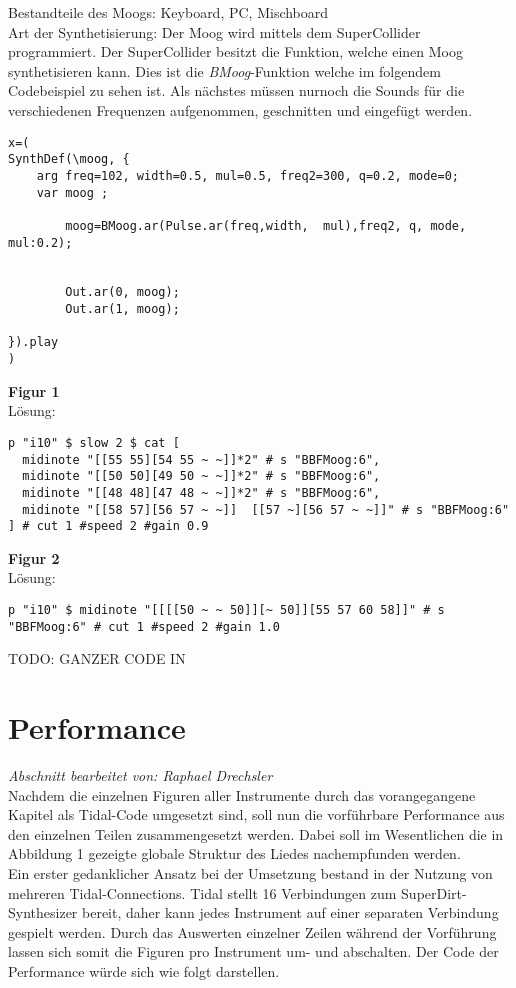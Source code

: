 \documentclass[
10pt, %
a4paper, %
oneside, %
headinclude,footinclude, %
BCOR5mm, %
]{scrartcl}
\begin{document}
\noindent Bestandteile des Moogs: Keyboard, PC, Mischboard\\
Art der Synthetisierung: Der Moog wird mittels dem SuperCollider programmiert. Der SuperCollider besitzt die Funktion, welche einen Moog synthetisieren kann.
Dies ist die \textit{BMoog}-Funktion welche im folgendem Codebeispiel zu sehen ist. Als nächstes müssen nurnoch die Sounds für die verschiedenen
Frequenzen aufgenommen, geschnitten und eingefügt werden.
\begin{lstlisting}
x=(
SynthDef(\moog, {
	arg freq=102, width=0.5, mul=0.5, freq2=300, q=0.2, mode=0;
	var moog ;
	
		moog=BMoog.ar(Pulse.ar(freq,width,  mul),freq2, q, mode, mul:0.2);
		
		
		Out.ar(0, moog);
		Out.ar(1, moog);
	
}).play
)
\end{lstlisting}
\noindent\textbf{Figur 1}\\
Lösung:
\begin{lstlisting}
p "i10" $ slow 2 $ cat [
  midinote "[[55 55][54 55 ~ ~]]*2" # s "BBFMoog:6",
  midinote "[[50 50][49 50 ~ ~]]*2" # s "BBFMoog:6",
  midinote "[[48 48][47 48 ~ ~]]*2" # s "BBFMoog:6",
  midinote "[[58 57][56 57 ~ ~]]  [[57 ~][56 57 ~ ~]]" # s "BBFMoog:6"
] # cut 1 #speed 2 #gain 0.9
\end{lstlisting}
\noindent\textbf{Figur 2}\\
Lösung:
\begin{lstlisting}
p "i10" $ midinote "[[[[50 ~ ~ 50]][~ 50]][55 57 60 58]]" # s "BBFMoog:6" # cut 1 #speed 2 #gain 1.0
\end{lstlisting}


TODO: GANZER CODE IN

\section{Performance}
\textit{Abschnitt bearbeitet von: Raphael Drechsler}\\

\noindent Nachdem die einzelnen Figuren aller Instrumente durch das vorangegangene Kapitel als Tidal-Code umgesetzt sind, soll nun die vorführbare Performance aus den einzelnen Teilen zusammengesetzt werden. Dabei soll im Wesentlichen die in Abbildung 1 gezeigte globale Struktur des Liedes nachempfunden werden.\\
Ein erster gedanklicher Ansatz bei der Umsetzung bestand in der Nutzung von mehreren Tidal-Connections. Tidal stellt 16 Verbindungen zum SuperDirt-Synthesizer bereit\cite{tid14}, daher kann jedes Instrument auf einer separaten Verbindung gespielt werden. Durch das Auswerten einzelner Zeilen während der Vorführung lassen sich somit die Figuren pro Instrument um- und abschalten. Der Code der Performance würde sich wie folgt darstellen.
\end{document}
